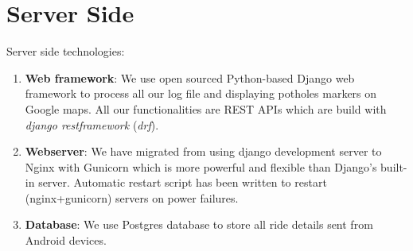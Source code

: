 \documentclass[12pt]{report}
\begin{document}
\section{Server Side}
\label{sec:server_side}

Server side technologies:
\begin{enumerate}
\item \textbf{Web framework}: We use open sourced Python-based Django
  web framework \cite[]{django} to process all our log file and displaying
  potholes markers on Google maps. All our functionalities are REST APIs which
  are build with \textit{django restframework} (\textit{drf}).
  \item \textbf{Webserver}: We have migrated from using django development server
    to Nginx with Gunicorn which is more powerful and flexible than Django's
    built-in server. Automatic restart script has been written to restart (nginx+gunicorn)
    servers on power failures.
  \item \textbf{Database}: We use Postgres database to store all ride details sent
    from Android devices.
\end{enumerate}








\end{document}
